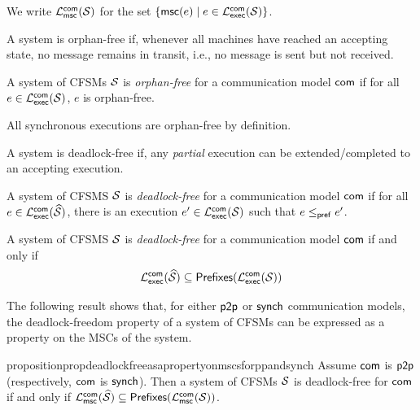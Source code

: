 We write $\mathcal{L}_{\mathsf{msc}}^{\mathsf{com}}(\mathcal{S})$ for the set $\{\mathsf{msc}(e) \mid e\in\mathcal{L}_{\mathsf{exec}}^{\mathsf{com}}(\mathcal{S})\}$.

A system is orphan-free if, whenever all machines have reached an accepting state, no message
remains in transit, i.e., no message is sent but not received.

\begin{definition}\label{def:orphan-free}
	A system of CFSMs $\mathcal{S}$ is \emph{orphan-free} for a communication model 
	$\mathsf{com}$ if
	for all $e\in\mathcal{L}_{\mathsf{exec}}^{\mathsf{com}}(\mathcal{S})$,
	$e$ is orphan-free.
\end{definition}

All  synchronous executions are orphan-free by definition.

A system is deadlock-free if, 
any \emph{partial} execution can be extended/completed to an accepting execution.

\begin{definition}\label{def:deadlock-free}
	A system of CFSMS $\mathcal{S}$ is \emph{deadlock-free} for a communication model
	$\mathsf{com}$ if for all 
	$e\in\mathcal{L}_{\mathsf{exec}}^{\mathsf{com}}(\widehat{\mathcal{S}})$,
	there is an execution $e'\in\mathcal{L}_{\mathsf{exec}}^{\mathsf{com}}(\mathcal{S})$ 
	such that $e\mathrel{\leq_{\mathsf{pref}}} e'$.
\end{definition}

\begin{remark}\label{rem:equivalent-formulation-of-deadlock-free-cfsms}
	A system of CFSMS $\mathcal{S}$ is \emph{deadlock-free} for a communication model
	$\mathsf{com}$ if and only if 
	$$
	\mathcal{L}_{\mathsf{exec}}^{\mathsf{com}}(\widehat{\mathcal{S}})\subseteq
	\mathsf{Prefixes}(\mathcal{L}_{\mathsf{exec}}^{\mathsf{com}}(\mathcal{S}))
	$$
\end{remark}

The following result shows that, for either $\mathsf{p2p}$ or $\mathsf{synch}$ communication
models, the deadlock-freedom property of a system of CFSMs can be expressed as a property on the MSCs
of the system. %

\begin{restatable}{proposition}{propdeadlockfreeasapropertyonmscsforppandsynch}
	\label{prop:deadlock-free-as-a-property-on-mscs-for-p2p-and-synch}
	Assume $\mathsf{com}$ is $\mathsf{p2p}$ (respectively, $\mathsf{com}$ is $\mathsf{synch}$).
	Then a system of CFSMs $\mathcal{S}$ is deadlock-free for $\mathsf{com}$ if and only if
	$\mathcal{L}_{\mathsf{msc}}^{\mathsf{com}}(\widehat{\mathcal{S}})\subseteq\mathsf{Prefixes}(\mathcal{L}_{\mathsf{msc}}^{\mathsf{com}}(\mathcal{S}))$.
\end{restatable}


%
